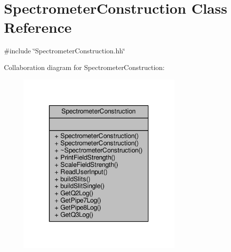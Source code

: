 \hypertarget{classSpectrometerConstruction}{}\section{Spectrometer\+Construction Class Reference}
\label{classSpectrometerConstruction}


{\ttfamily \#include \char`\"{}Spectrometer\+Construction.\+hh\char`\"{}}



Collaboration diagram for Spectrometer\+Construction\+:
\nopagebreak
\begin{figure}[H]
\begin{center}
\leavevmode
\includegraphics[width=232pt]{classSpectrometerConstruction__coll__graph}
\end{center}
\end{figure}
